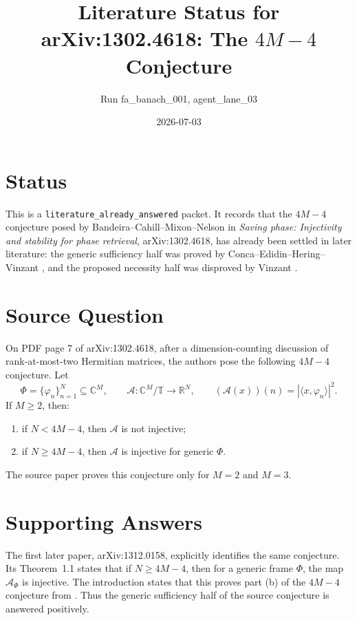 \documentclass[11pt]{article}
\title{Literature Status for arXiv:1302.4618: The \(4M-4\) Conjecture}
\author{Run fa\_banach\_001, agent\_lane\_03}
\date{2026-07-03}
\begin{document}
\maketitle

\section*{Status}

This is a \texttt{literature\_already\_answered} packet.  It records that the
\(4M-4\) conjecture posed by Bandeira--Cahill--Mixon--Nelson in
\emph{Saving phase: Injectivity and stability for phase retrieval},
arXiv:1302.4618, has already been settled in later literature: the generic
sufficiency half was proved by Conca--Edidin--Hering--Vinzant
\cite{CEHV13}, and the proposed necessity half was disproved by Vinzant
\cite{Vinzant15}.

\section*{Source Question}

On PDF page 7 of arXiv:1302.4618, after a dimension-counting discussion of
rank-at-most-two Hermitian matrices, the authors pose the following
\(4M-4\) conjecture.  Let
\[
  \Phi=\{\varphi_n\}_{n=1}^N\subseteq \mathbb{C}^M,\qquad
  \mathcal A:\mathbb{C}^M/\mathbb T\to\mathbb R^N,\qquad
  (\mathcal A(x))(n)=|\langle x,\varphi_n\rangle|^2 .
\]
If \(M\geq 2\), then:
\begin{enumerate}
\item[(a)] if \(N<4M-4\), then \(\mathcal A\) is not injective;
\item[(b)] if \(N\geq 4M-4\), then \(\mathcal A\) is injective for generic
\(\Phi\).
\end{enumerate}
The source paper proves this conjecture only for \(M=2\) and \(M=3\).

\section*{Supporting Answers}

The first later paper, arXiv:1312.0158, explicitly identifies the same
conjecture.  Its Theorem~1.1 states that if \(N\geq 4M-4\), then for a generic
frame \(\Phi\), the map \(\mathcal A_\Phi\) is injective.  The introduction
states that this proves part (b) of the \(4M-4\) conjecture from
\cite{BCMN13}.  Thus the generic sufficiency half of the source conjecture is
answered positively.
\end{document}
